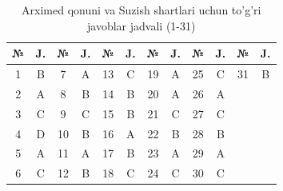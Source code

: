 \begin{table}[h!]
\centering
\caption{Arximed qonuni va Suzish shartlari uchun to'g'ri javoblar jadvali (1-31)}
\begin{tabular}{|c|c|c|c|c|c|c|c|c|c|c|c|}
\hline
№ & J. & № & J. & № & J. & № & J. & № & J. & № & J. \\ \hline
1 & B & 7 & A & 13 & C & 19 & A & 25 & C & 31 & B \\ \hline
2 & A & 8 & B & 14 & B & 20 & A & 26 & A & & \\ \hline
3 & C & 9 & C & 15 & B & 21 & C & 27 & C & & \\ \hline
4 & D & 10 & B & 16 & A & 22 & B & 28 & B & & \\ \hline
5 & A & 11 & A & 17 & B & 23 & A & 29 & A & & \\ \hline
6 & C & 12 & B & 18 & C & 24 & C & 30 & C & & \\ \hline
\end{tabular}
\end{table}